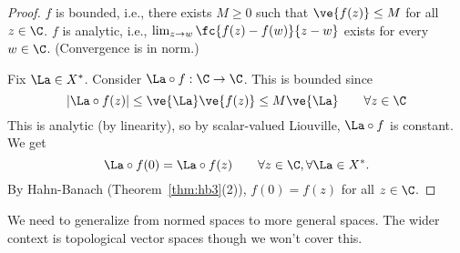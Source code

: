 \begin{proof}
$f$ is bounded, i.e., there exists $M\ge 0$ such that $\ve{f(z)}\le M$ for all $z\in \C$. $f$ is analytic, i.e., $\lim_{z\to w}\fc{f(z)-f(w)}{z-w}$ exists for every $w\in \C$. (Convergence is in norm.)

Fix $\La\in X^*$. Consider $\La\circ f:\C\to \C$. This is bounded since
\[
|\La\circ f(z)|\le \ve{\La}\ve{f(z)}\le M\ve{\La}\qquad \forall z\in \C
\]
This is analytic (by linearity), so by scalar-valued Liouville, $\La\circ f$ is constant. We get
\[
\La\circ f(0)=\La \circ f(z)\qquad \forall z\in \C, \forall \La\in X^*.
\]
By Hahn-Banach (Theorem~\ref{thm:hb3}(2)), $f(0)=f(z)$ for all $z\in \C$.
\end{proof}

We need to generalize from normed spaces to more general spaces. The wider context is topological vector spaces though we won't cover this. 


